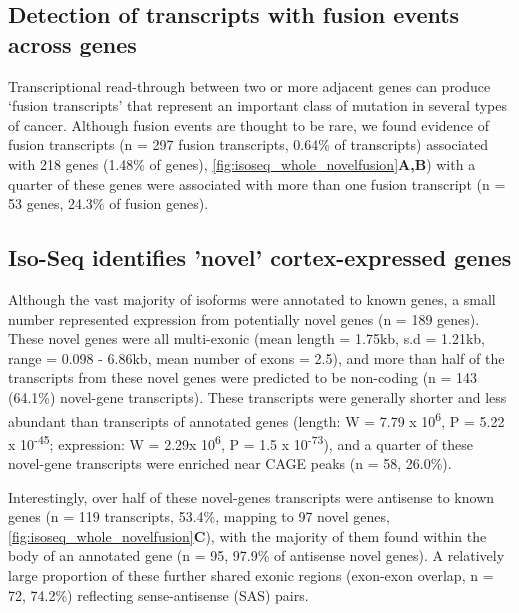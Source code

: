 \subsection{Detection of transcripts with fusion events across genes}
\label{ch4:fusion_trans}
Transcriptional read-through between two or more adjacent genes can produce ‘fusion transcripts’ that represent an important class of mutation in several types of cancer\cite{McCartney2019}. Although fusion events are thought to be rare\cite{Akiva2006a}, we found evidence of fusion transcripts (n = 297 fusion transcripts, 0.64\% of transcripts) associated with 218 genes (1.48\% of genes), \cref{fig:isoseq_whole_novelfusion}\textbf{A,B}) with a quarter of these genes were associated with more than one fusion transcript (n = 53 genes, 24.3\% of fusion genes).

\subsection{Iso-Seq identifies 'novel' cortex-expressed genes}
\label{sec:whole_novelgenes}
Although the vast majority of isoforms were annotated to known genes, a small number represented expression from potentially novel genes (n = 189 genes).  These novel genes were all multi-exonic (mean length = 1.75kb, s.d = 1.21kb, range = 0.098 - 6.86kb, mean number of exons = 2.5), and more than half of the transcripts from these novel genes were predicted to be non-coding (n = 143 (64.1\%) novel-gene transcripts). These transcripts were generally shorter and less abundant than transcripts of annotated genes (length: W = 7.79 x 10\textsuperscript{6}, P = 5.22 x 10\textsuperscript{-45}; expression: W = 2.29x 10\textsuperscript{6}, P = 1.5 x 10\textsuperscript{-73}), and a quarter of these novel-gene transcripts were enriched near CAGE peaks (n = 58, 26.0\%). 

Interestingly, over half of these novel-genes transcripts were antisense to known genes (n = 119 transcripts, 53.4\%, mapping to 97 novel genes, \cref{fig:isoseq_whole_novelfusion}\textbf{C}), with the majority of them found within the body of an annotated gene (n = 95, 97.9\% of antisense novel genes). A relatively large proportion of these further shared exonic regions (exon-exon overlap, n = 72, 74.2\%) reflecting sense-antisense (SAS) pairs. 

